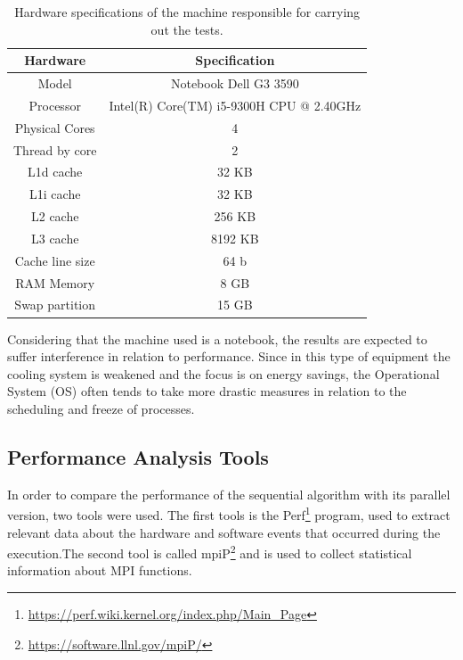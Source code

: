 \documentclass[conference]{IEEEtran}
\begin{document}
\begin{table}
\caption{Hardware specifications of the machine responsible for carrying out the tests.}
\centering
\begin{tabular}{cc}
\hline
\textbf{Hardware} & \textbf{Specification}                   \\ \hline
Model             & Notebook Dell G3 3590                    \\
Processor         & Intel(R) Core(TM) i5-9300H CPU @ 2.40GHz \\
Physical Cores    & 4                                        \\
Thread by core    & 2                                        \\
L1d cache         & 32 KB                                    \\
L1i cache         & 32 KB                                    \\
L2 cache          & 256 KB                                   \\
L3 cache          & 8192 KB                                  \\
Cache line size   & 64 b                                     \\
RAM Memory        & 8 GB                                     \\
Swap partition    & 15 GB                                    \\ \hline
\end{tabular}
\label{tab:pc-config}
\end{table}

Considering that the machine used is a notebook, the results are expected to suffer interference in relation to performance. Since in this type of equipment the cooling system is weakened and the focus is on energy savings, the Operational System (OS) often tends to take more drastic measures in relation to the scheduling and freeze of processes.

\subsection{Performance Analysis Tools}\label{subsec:perftools}

In order to compare the performance of the sequential algorithm with its parallel version, two tools were used. The first tools is the Perf\footnote{\url{https://perf.wiki.kernel.org/index.php/Main_Page}} program, used to extract relevant data about the hardware and software events that occurred during the execution.The second tool is called mpiP\footnote{\url{https://software.llnl.gov/mpiP/}} and is used to collect statistical information about MPI functions.
\end{document}
